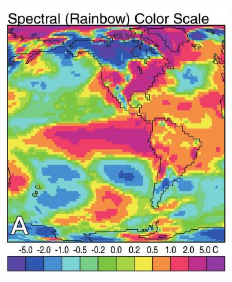 \documentclass[11pt]{isuthesis}\usepackage[]{graphicx}\usepackage[]{color}
\begin{document}
\begin{figure}[!htbp]\centering
\begin{minipage}[c]{.24\textwidth}
  \includegraphics[width=\textwidth]{RainbowScaleOrig}
\end{minipage}
\begin{minipage}[c]{.75\textwidth}
\hfil\begin{subfigure}[b]{.32\textwidth}\centering

\end{subfigure}
\end{minipage}
\end{figure}
\end{document}
